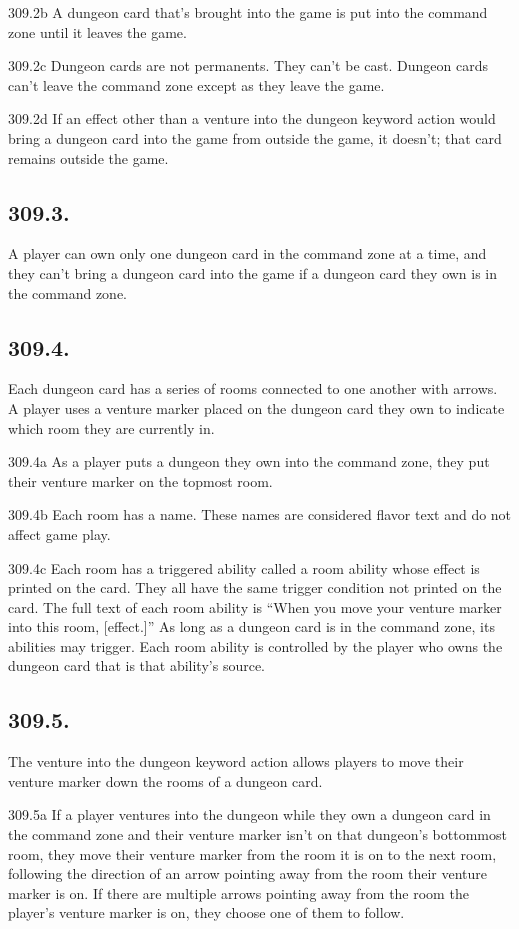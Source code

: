 309.2b A dungeon card that’s brought into the game is put into the command zone until it leaves the game.

309.2c Dungeon cards are not permanents. They can’t be cast. Dungeon cards can’t leave the command zone except as they leave the game.

309.2d If an effect other than a venture into the dungeon keyword action would bring a dungeon card into the game from outside the game, it doesn’t; that card remains outside the game.

\subsection*{309.3.}
A player can own only one dungeon card in the command zone at a time, and they can’t bring a dungeon card into the game if a dungeon card they own is in the command zone.

\subsection*{309.4.}
Each dungeon card has a series of rooms connected to one another with arrows. A player uses a venture marker placed on the dungeon card they own to indicate which room they are currently in.

309.4a As a player puts a dungeon they own into the command zone, they put their venture marker on the topmost room.

309.4b Each room has a name. These names are considered flavor text and do not affect game play.

309.4c Each room has a triggered ability called a room ability whose effect is printed on the card. They all have the same trigger condition not printed on the card. The full text of each room ability is “When you move your venture marker into this room, [effect.]” As long as a dungeon card is in the command zone, its abilities may trigger. Each room ability is controlled by the player who owns the dungeon card that is that ability’s source.

\subsection*{309.5.}
The venture into the dungeon keyword action allows players to move their venture marker down the rooms of a dungeon card.

309.5a If a player ventures into the dungeon while they own a dungeon card in the command zone and their venture marker isn’t on that dungeon’s bottommost room, they move their venture marker from the room it is on to the next room, following the direction of an arrow pointing away from the room their venture marker is on. If there are multiple arrows pointing away from the room the player’s venture marker is on, they choose one of them to follow.

